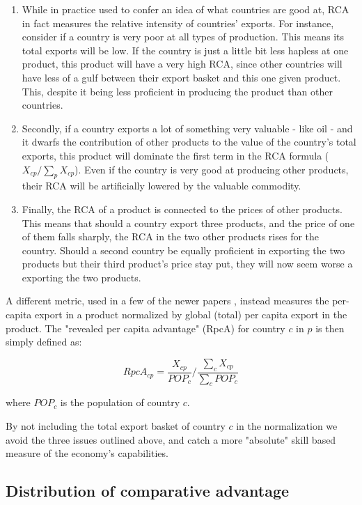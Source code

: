 \documentclass[11pt]{article}
\begin{document}
\begin{appendices}
\begin{enumerate}
\item While in practice used to confer an idea of what countries are good at, RCA in fact measures the relative intensity of countries' exports. For instance, consider if a country is very poor at all types of production. This means its total exports will be low. If the country is just a little bit less hapless at one product, this product will have a very high RCA, since other countries will have less of a gulf between their export basket and this one given product. This, despite it being less proficient in producing the product than other countries.
\item Secondly, if a country exports a lot of something very valuable - like oil - and it dwarfs the contribution of other products to the value of the country's total exports, this product will dominate the first term in the RCA formula ($X_{cp} / \sum_p X_{cp}$). Even if the country is very good at producing other products, their RCA will be artificially lowered by the valuable commodity.
\item Finally, the RCA of a product is connected to the prices of other products. This means that should a country export three products, and the price of one of them falls sharply, the RCA in the two other products rises for the country. Should a second country be equally proficient in exporting the two products but their third product's price stay put, they will now seem worse a exporting the two products.
\end{enumerate}

A different metric, used in a few of the newer papers \citep{hausmann_implied_2019}, instead measures the per-capita export in a product normalized by global (total) per capita export in the product. The "revealed per capita advantage" (RpcA) for country $c$ in $p$ is then simply defined as:

\[
	RpcA_{cp} = \frac{X_{cp}}{POP_{c}} \bigg / \frac{\sum_c X_{cp}}{\sum_c POP_c}
\]

where $POP_c$ is the population of country $c$.

By not including the total export basket of country $c$ in the normalization we avoid the three issues outlined above, and catch a more "absolute" skill based measure of the economy's capabilities. 

\subsection{Distribution of comparative advantage}
\label{subsec:dist}


\end{appendices}
\end{document}
